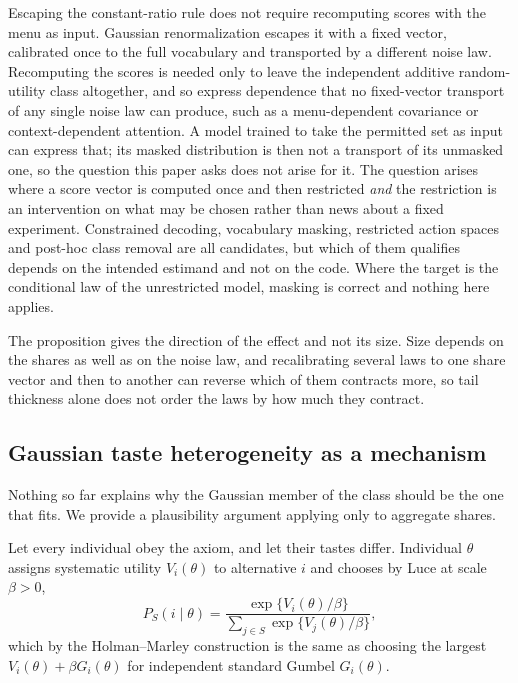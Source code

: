 \documentclass[11pt]{article}
\theoremstyle{italichead}
\begin{document}
Escaping the constant-ratio rule does not require recomputing scores with the menu as input.
Gaussian renormalization escapes it with a fixed vector, calibrated once to the full vocabulary
and transported by a different noise law. Recomputing the scores is needed only to leave the
independent additive random-utility class altogether, and so express dependence that no fixed-vector transport of any single noise law can
produce, such as a menu-dependent covariance or context-dependent attention. A model trained to
take the permitted set as input can express that; its masked distribution is then not a transport
of its unmasked one, so the question this paper asks does not arise for it. The question arises
where a score vector is computed once and then restricted \emph{and} the restriction is an
intervention on what may be chosen rather than news about a fixed experiment. Constrained
decoding, vocabulary masking, restricted action spaces and post-hoc class removal are all
candidates, but which of them qualifies depends on the intended estimand and not on the code.
Where the target is the conditional law of the unrestricted model, masking is correct and nothing
here applies.

The proposition gives the direction of the effect and not its size. Size depends on the shares
as well as on the noise law, and recalibrating several laws to one share vector and then to
another can reverse which of them contracts more, so tail thickness alone does not order the
laws by how much they contract.

\subsection{Gaussian taste heterogeneity as a mechanism}
\label{sec:mixture}

Nothing so far explains why the Gaussian member of the class should be the one that fits.
We provide a plausibility argument applying only to aggregate shares.

Let every individual obey the axiom, and let their tastes differ. Individual $\theta$
assigns systematic utility $V_i(\theta)$ to alternative $i$ and chooses by Luce at scale
$\beta > 0$,
\begin{equation}
P_S(i \mid \theta) = \frac{\exp\{V_i(\theta)/\beta\}}{\sum_{j \in S}\exp\{V_j(\theta)/\beta\}},
\label{eq:condluce}
\end{equation}
which by the Holman--Marley construction \cite{lucesuppes1965,holman1974} is the same as
choosing the largest
$V_i(\theta) + \beta G_i(\theta)$ for independent standard Gumbel $G_i(\theta)$.
\end{document}
